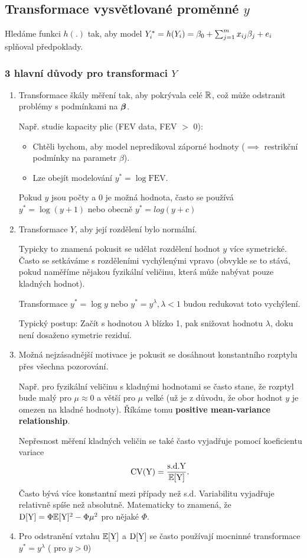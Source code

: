 \subsection{Transformace vysvětlované proměnné $y$}

Hledáme funkci $h(.)$ tak, aby model $Y_i^* = h(Y_i) = \beta_0 + \sum_{j=1}^{m} x_{ij} \beta_j + e_i$ splňoval předpoklady.

\subsubsection*{3 hlavní důvody pro transformaci $Y$}
\begin{enumerate}
	\item Transformace škály měření tak, aby pokrývala celé $\mathbb{R}$, což může odstranit problémy s podmínkami na $\boldsymbol{\beta}$.
	
	Např. studie kapacity plic (FEV data, FEV $>$ 0):
	\begin{itemize}
		\item Chtěli bychom, aby model nepredikoval záporné hodnoty ($\implies$ restrikční podmínky na parametr $\beta$).
		\item Lze obejít modelování $y^* = \log \mathrm{FEV}$.
	\end{itemize}

	Pokud $y$ jsou počty a 0 je možná hodnota, často se používá $y^* = \log (y+1)$ nebo obecně $y^* = log(y + c)$
	
	\item Transformace $Y$, aby její rozdělení bylo  normální.
	
	Typicky to znamená pokusit se udělat rozdělení hodnot $y$ více symetrické. Často se setkáváme s rozděleními vychýlenými vpravo (obvykle se to stává, pokud naměříme nějakou fyzikální veličinu, která může nabývat pouze kladných hodnot).
	
	Transformace $y^* = \log y$ nebo $y^* = y^{\lambda}, \lambda < 1$ budou redukovat toto vychýlení.
	
	Typický postup: Začít s hodnotou $\lambda$ blízko 1, pak snižovat hodnotu $\lambda$, doku není dosaženo  symetrie reziduí.
	
	\item Možná nejzásadnější motivace je pokusit se dosáhnout konstantního rozptylu přes všechna pozorování.
	
	Např. pro fyzikální veličinu s kladnými hodnotami se často stane, že rozptyl bude malý pro $\mu \approx 0$ a větší pro $\mu$ velké (už je z důvodu, že obor hodnot $y$ je omezen na kladné hodnoty). Říkáme tomu \textbf{positive mean-variance relationship}.
	
  Nepřesnost měření kladných veličin se také často vyjadřuje pomocí koeficientu variace
$$
 \text{CV}(\text{Y}) = \frac{\text{s.d.} \text{Y}}{\mathbb{E}[\text{Y}]}.
$$
Často bývá více konstantní mezi případy než s.d. Variabilitu vyjadřuje relativně spíše než absolutně. Matematicky to znamená, že $ \mathrm{D}[\text{Y}] = \Phi \mathbb{E}[\text{Y}]^2 - \Phi \mu^2 $ pro nějaké $ \Phi $.
\item Pro odstranění vztahu $ \mathbb{E} [\text{Y}] $ a $ \mathrm{D}[\text{Y}] $ se často používají mocninné transformace $ y^* = y^{\lambda} $ ( pro $ y > 0 $)
\end{enumerate}